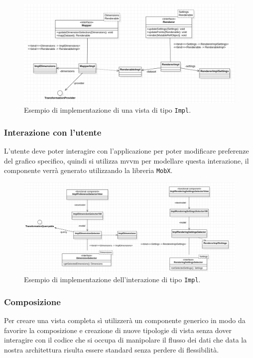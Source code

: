 \begin{figure}[h!]
  \centering
  \includegraphics[scale=0.60]{../../assets/classi_uml/modelvista.png}
  \caption{Esempio di implementazione di una vista di tipo \texttt{Impl}.}
\end{figure}
\newpage
\subsubsection{Interazione con l'utente}
L'utente deve poter interagire con l'applicazione per poter modificare
preferenze del grafico specifico, quindi si utilizza mvvm per modellare questa
interazione, il componente verrà generato utilizzando la libreria \texttt{MobX}.

\begin{figure}[h!]
  \centering
  \includegraphics[scale=0.55]{../../assets/classi_uml/modelinterazione.png}
  \caption{Esempio di implementazione dell'interazione di tipo \texttt{Impl}.}
\end{figure}

\subsubsection{Composizione}
Per creare una vista completa sì utilizzerà un componente generico in modo da
favorire la composizione e creazione di nuove tipologie di vista senza dover
interagire con il codice che si occupa di manipolare il flusso dei dati che data
la nostra architettura risulta essere standard senza perdere di flessibilità.

